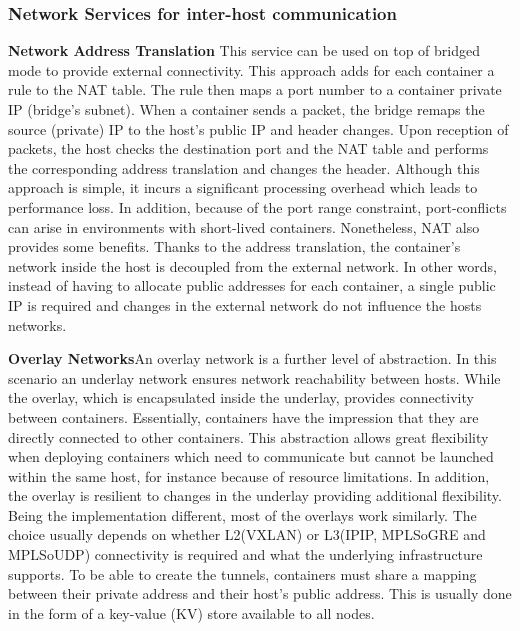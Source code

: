 \documentclass[conference]{IEEEtran}
\begin{document}
\subsubsection{Network Services for inter-host communication}\hfill\break
\textbf{Network Address Translation}\hspace{0.2cm} This service can be used on top of bridged mode to provide external connectivity. This approach adds for each container a rule to the NAT table. The rule then maps a port number to a container private IP (bridge's subnet). When a container sends a packet, the bridge remaps the source (private) IP to the host's public IP and header changes. Upon reception of packets, the host checks the destination port and the NAT table and performs the corresponding address translation and changes the header. Although this approach is simple, it incurs a significant processing overhead which leads to performance loss. In addition, because of the port range constraint, port-conflicts can arise in environments with short-lived containers. Nonetheless, NAT also provides some benefits. Thanks to the address translation, the container's network inside the host is decoupled from the external network. In other words, instead of having to allocate public addresses for each container, a single public IP is required and changes in the external network do not influence the hosts networks.

\noindent\textbf{Overlay Networks}\hspace{0.2cm}An overlay network is a further level of abstraction. In this scenario an underlay network ensures network reachability between hosts. While the overlay, which is encapsulated inside the underlay, provides connectivity between containers. Essentially, containers have the impression that they are directly connected to other containers. This abstraction allows great flexibility when deploying containers which need to communicate but cannot be launched within the same host, for instance because of resource limitations. In addition, the overlay is resilient to changes in the underlay providing additional flexibility.
Being the implementation different, most of the overlays work similarly. The choice usually depends on whether L2(VXLAN) or L3(IPIP, MPLSoGRE and MPLSoUDP) connectivity is required and what the underlying infrastructure supports. To be able to create the tunnels, containers must share a mapping between their private address and their host's public address. This is usually done in the form of a key-value (KV) store available to all nodes. 
\end{document}
